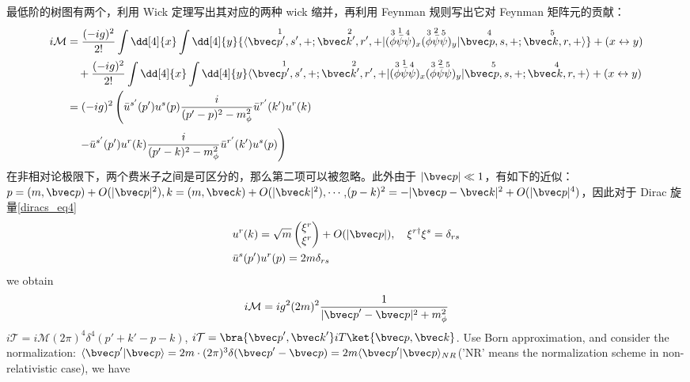 最低阶的树图有两个，利用 Wick 定理写出其对应的两种 wick 缩并，再利用 Feynman 规则写出它对 Feynman 矩阵元的贡献：
\begin{equation}
\begin{aligned}
\notag i\mathcal{M}&=
\frac{(-ig)^2}{2!}\int \dd[4]{x} \int  \dd[4]{y} 
{
\langle\overset{1}{\bvec p',s',+};\overset{2}{\bvec k',r',+}|
(\overset{3}\phi  \overset{1}{\bar{\psi}} \overset{4}\psi)_x 
(\overset{3}\phi \overset{2}{\bar{\psi}} \overset{5}\psi)_y
|\overset{4}{\bvec p,s,+};\overset{5}{\bvec k,r,+} \rangle
}+(x\leftrightarrow y)\\
&\quad +
\frac{(-ig)^2}{2!}\int \dd[4]{x} \int  \dd[4]{y} 
\langle\overset{1}{\bvec p',s',+};\overset{2}{\bvec k',r',+}|
(\overset{3}\phi  \overset{1}{\bar{\psi}} \overset{4}\psi)_x 
(\overset{3}\phi \overset{2}{\bar{\psi}} \overset{5}\psi)_y
|\overset{5}{\bvec p,s,+};\overset{4}{\bvec k,r,+} \rangle
+(x\leftrightarrow y)\\
&=(-ig)^2\left(
 \bar u^{s'}(p')u^s(p) \frac{i}{(p'-p)^2-m_{\phi}^2} \bar u^{r'}(k') u^r(k)
\right.\\
&\left.\quad 
-\bar u^{s'}(p')u^r(k) \frac{i}{(p'-k)^2-m_{\phi}^2} \bar u^{r'}(k') u^{s}(p)  \right)
\end{aligned}
\end{equation}
在非相对论极限下，两个费米子之间是可区分的，那么第二项可以被忽略。此外由于 $|\bvec p|\ll 1$，有如下的近似：$p=(m,{\bvec p})+O(|{\bvec p}|^2),k=(m,{\bvec k})+O(|{\bvec k}|^2),\cdots$,$(p-k)^2=-|{\bvec p}-{\bvec k}|^2+O(|{\bvec p}|^4)$，因此对于 Dirac 旋量\autoref{diracs_eq4}~
\begin{align*}
&u^r(k)=\sqrt{m} \begin{pmatrix}\xi^r\\ \xi^r\end{pmatrix}+O(|{\bvec p}|),\quad  \xi^{r\dagger}\xi^s=\delta_{rs}\\
&\bar u^s(p') u^r(p)=2m \delta_{rs}
\end{align*}
we obtain
\begin{equation}
\begin{aligned}
i\mathcal{M} = i g^2 (2m)^2 \frac{1}{|{\bvec p}'-{\bvec p}|^2+m_\phi^2}
\end{aligned}
\end{equation}
$i\mathcal{T}=i\mathcal{M}(2\pi)^4 \delta^4(p'+k'-p-k)$, $i\mathcal{T} = \bra{{\bvec p}',{\bvec k}'}iT\ket{{\bvec p},{\bvec k}}$. Use Born approximation, and consider the normalization: $\langle{\bvec p}'|{\bvec p}\rangle=2m\cdot (2\pi)^3 \delta({\bvec p}'-{\bvec p}) = 2m \langle{\bvec p}'|{\bvec p}\rangle_{NR}$('NR' means the normalization scheme in non-relativistic case), we have
